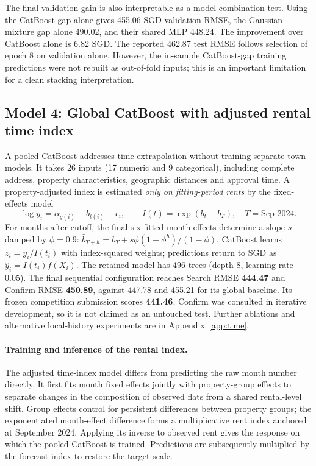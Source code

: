 \documentclass[10pt,a4paper]{article}
\begin{document}
The final validation gain is also interpretable as a model-combination test. Using the CatBoost gap alone gives 455.06 SGD validation RMSE, the Gaussian-mixture gap alone 490.02, and their shared MLP 448.24. The improvement over CatBoost alone is 6.82 SGD. The reported 462.87 test RMSE follows selection of epoch 8 on validation alone. However, the in-sample CatBoost-gap training predictions were not rebuilt as out-of-fold inputs; this is an important limitation for a clean stacking interpretation.


\subsection{Model 4: Global CatBoost with adjusted rental time index}\label{sec:m4}
A pooled CatBoost addresses time extrapolation without training separate town models. It takes 26 inputs (17 numeric and 9 categorical), including complete address, property characteristics, geographic distances and approval time. A property-adjusted index is estimated \emph{only on fitting-period rents} by the fixed-effects model
\begin{equation}\label{eq:indexmain}
\log y_i=\alpha_{g(i)}+b_{t(i)}+\epsilon_i,\qquad
I(t)=\exp(b_t-b_T),\quad T=\text{Sep 2024}.
\end{equation}
For months after cutoff, the final six fitted month effects determine a slope $s$ damped by $\phi=0.9$: $\hat b_{T+h}=b_T+s\phi(1-\phi^h)/(1-\phi)$. CatBoost learns $z_i=y_i/I(t_i)$ with index-squared weights; predictions return to SGD as $\hat y_i=I(t_i)f(X_i)$. The retained model has 496 trees (depth 8, learning rate 0.05). The final sequential configuration reaches Search RMSE \textbf{444.47} and Confirm RMSE \textbf{450.89}, against 447.78 and 455.21 for its global baseline. Its frozen competition submission scores \textbf{441.46}. Confirm was consulted in iterative development, so it is not claimed as an untouched test. Further ablations and alternative local-history experiments are in Appendix~\ref{app:time}.


\paragraph{Training and inference of the rental index.}
The adjusted time-index model differs from predicting the raw month number directly. It first fits month fixed effects jointly with property-group effects to separate changes in the composition of observed flats from a shared rental-level shift. Group effects control for persistent differences between property groups; the exponentiated month-effect difference forms a multiplicative rent index anchored at September 2024. Applying its inverse to observed rent gives the response on which the pooled CatBoost is trained. Predictions are subsequently multiplied by the forecast index to restore the target scale.
\end{document}
